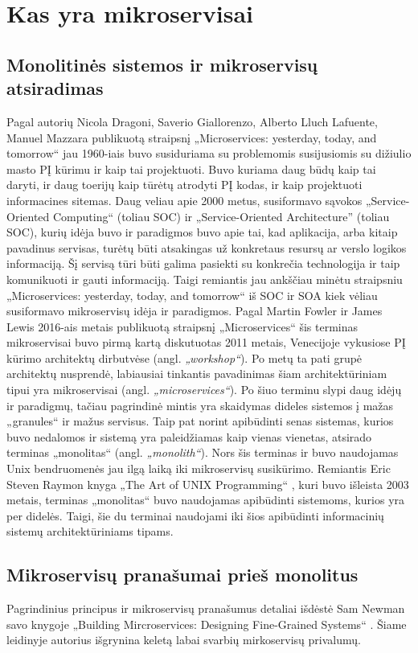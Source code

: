 \section{Kas yra mikroservisai}

\subsection{Monolitinės sistemos ir mikroservisų atsiradimas}
Pagal autorių Nicola Dragoni, Saverio Giallorenzo, Alberto Lluch Lafuente, Manuel Mazzara publikuotą straipsnį „Microservices: yesterday, today, and tomorrow“
\cite{Mis7} jau 1960-iais buvo susiduriama su problemomis susijusiomis su dižiulio masto PĮ kūrimu ir kaip tai projektuoti.
Buvo kuriama daug būdų kaip tai daryti, ir daug toerijų kaip tūrėtų atrodyti PĮ kodas, ir kaip projektuoti informacines sitemas.
Daug veliau apie 2000 metus, susiformavo sąvokos „Service-Oriented Computing“ (toliau SOC) ir „Service-Oriented Architecture” (toliau SOC), kurių idėja buvo ir paradigmos buvo apie
tai, kad aplikacija, arba kitaip pavadinus servisas, turėtų būti atsakingas už konkretaus resursų ar verslo logikos informaciją.
Šį servisą tūri būti galima pasiekti su konkrečia technologija ir taip komunikuoti ir gauti informaciją. 
Taigi remiantis jau ankščiau minėtu straipsniu „Microservices: yesterday, today, and tomorrow“ \cite{Mis7} iš SOC ir SOA kiek vėliau susiformavo
mikroservisų idėja ir paradigmos. Pagal Martin Fowler ir James Lewis 2016-ais metais publikuotą straipsnį „Microservices“ \cite{Misc6}
šis terminas mikroservisai buvo pirmą kartą diskutuotas 2011 metais, Venecijoje vykusiose PĮ kūrimo architektų
dirbutvėse (angl. \textit{„workshop“}). Po metų ta pati grupė architektų nusprendė, labiausiai tinkantis pavadinimas
šiam architektūriniam tipui yra mikroservisai (angl. \textit{„microservices“}). Po šiuo terminu slypi daug idėjų ir paradigmų,
tačiau pagrindinė mintis yra skaidymas dideles sistemos į mažas „granules“ ir mažus servisus.
Taip pat norint apibūdinti senas sistemas, kurios buvo nedalomos ir sistemą yra paleidžiamas kaip vienas vienetas, atsirado terminas „monolitas“ (angl. \textit{„monolith“}).
Nors šis terminas ir buvo naudojamas Unix bendruomenės jau ilgą laiką iki mikroservisų susikūrimo.
Remiantis Eric Steven Raymon knyga „The Art of UNIX Programming“ \cite{Bk4}, kuri buvo išleista 2003 metais,
terminas „monolitas“ buvo naudojamas apibūdinti sistemoms, kurios yra per didelės. Taigi, šie du terminai
naudojami iki šios apibūdinti informacinių sistemų architektūriniams tipams.
\subsection{Mikroservisų pranašumai prieš monolitus}
Pagrindinius principus ir mikroservisų pranašumus detaliai išdėstė Sam Newman savo knygoje „Building Mircroservices: Designing Fine-Grained Systems“ \cite{Bk2}.
Šiame leidinyje autorius išgrynina keletą labai svarbių mirkoservisų privalumų.
